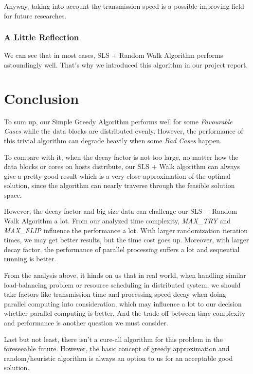 \documentclass{article}
\begin{document}
    Anyway, taking into account the transmission speed is a possible improving field for future researches. 
    
\subsubsection{A Little Reflection}
We can see that in most cases, SLS + Random Walk Algorithm performs astoundingly well. That's why we introduced this algorithm in our project report.
    
\section{Conclusion}
To sum up, our Simple Greedy Algorithm performs well for some \textit{Favourable Cases} while the data blocks are distributed evenly. However, the performance of this trivial algorithm can degrade heavily when some \textit{Bad Cases} happen.

To compare with it, when the decay factor is not too large, no matter how the data blocks or cores on hosts distribute, our SLS + Walk algorithm can always give a pretty good result which is a very close approximation of the optimal solution, since the algorithm can nearly traverse through the feasible solution space.  

However, the decay factor and big-size data can challenge our SLS + Random Walk Algorithm a lot. From our analyzed time complexity, \textit{MAX\_TRY} and \textit{MAX\_FLIP} influence the performance a lot. With larger randomization iteration times, we may get better results, but the time cost goes up. Moreover, with larger decay factor, the performance of parallel processing suffers a lot and sequential running is better.

From the analysis above, it hinds on us that in real world, when handling similar load-balancing problem or resource scheduling in distributed system, we should take factors like transmission time and processing speed decay when doing parallel computing into consideration, which may influence a lot to our decision whether parallel computing is better. And the trade-off between time complexity and performance is another question we must consider.

Last but not least, there isn't a cure-all algorithm for this problem in the foreseeable future. However, the basic concept of greedy approximation and random/heuristic algorithm is always an option to us for an acceptable good solution.
    
\end{document}
